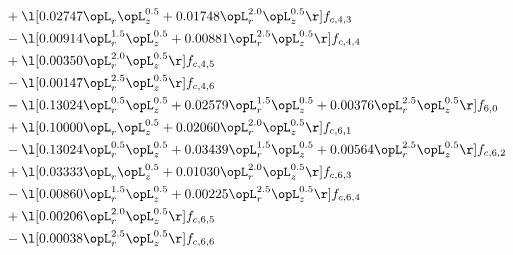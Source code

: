 \begin{alignat}{2}
& + \l[  0.02747 \opL_r \opL_z^{0.5} +  0.01748 \opL_r^{2.0} \opL_z^{0.5}  \r] f_{c,4,3} \nonumber \\ 
& - \l[  0.00914 \opL_r^{1.5} \opL_z^{0.5} +  0.00881 \opL_r^{2.5} \opL_z^{0.5}  \r] f_{c,4,4} \nonumber \\ 
& + \l[  0.00350 \opL_r^{2.0} \opL_z^{0.5}  \r] f_{c,4,5} \nonumber \\ 
& - \l[  0.00147 \opL_r^{2.5} \opL_z^{0.5}  \r] f_{c,4,6} \nonumber \\ 
& - \l[  0.13024 \opL_r^{0.5} \opL_z^{0.5} +  0.02579 \opL_r^{1.5} \opL_z^{0.5} +  0.00376 \opL_r^{2.5} \opL_z^{0.5}  \r] f_{6,0} \nonumber \\ 
& + \l[  0.10000 \opL_r \opL_z^{0.5} +  0.02060 \opL_r^{2.0} \opL_z^{0.5}  \r] f_{c,6,1} \nonumber \\ 
& - \l[  0.13024 \opL_r^{0.5} \opL_z^{0.5} +  0.03439 \opL_r^{1.5} \opL_z^{0.5} +  0.00564 \opL_r^{2.5} \opL_z^{0.5}  \r] f_{c,6,2} \nonumber \\ 
& + \l[  0.03333 \opL_r \opL_z^{0.5} +  0.01030 \opL_r^{2.0} \opL_z^{0.5}  \r] f_{c,6,3} \nonumber \\ 
& - \l[  0.00860 \opL_r^{1.5} \opL_z^{0.5} +  0.00225 \opL_r^{2.5} \opL_z^{0.5}  \r] f_{c,6,4} \nonumber \\ 
& + \l[  0.00206 \opL_r^{2.0} \opL_z^{0.5}  \r] f_{c,6,5} \nonumber \\ 
& - \l[  0.00038 \opL_r^{2.5} \opL_z^{0.5}  \r] f_{c,6,6} \nonumber \\ 
\end{alignat} 


